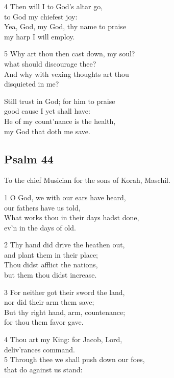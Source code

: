 4 Then will I to God’s altar go,\\
to God my chiefest joy:\\
Yea, God, my God, thy name to praise\\
my harp I will employ.

5 Why art thou then cast down, my soul?\\
what should discourage thee?\\
And why with vexing thoughts art thou\\
disquieted in me?

Still trust in God; for him to praise\\
good cause I yet shall have:\\
He of my count’nance is the health,\\
my God that doth me save.

\begin{center}
\quad{}\quad{}
\end{center}

\subsection*{Psalm 44}

To the chief Musician
for the sons of Korah, Maschil.

1 O God, we with our ears have heard,\\
our fathers have us told,\\
What works thou in their days hadst done,\\
ev’n in the days of old.

2 Thy hand did drive the heathen out,\\
and plant them in their place;\\
Thou didst afflict the nations,\\
but them thou didst increase.

3 For neither got their sword the land,\\
nor did their arm them save;\\
But thy right hand, arm, countenance;\\
for thou them favor gave.

4 Thou art my King: for Jacob, Lord,\\
deliv’rances command.\\
5 Through thee we shall push down our foes,\\
that do against us stand:

